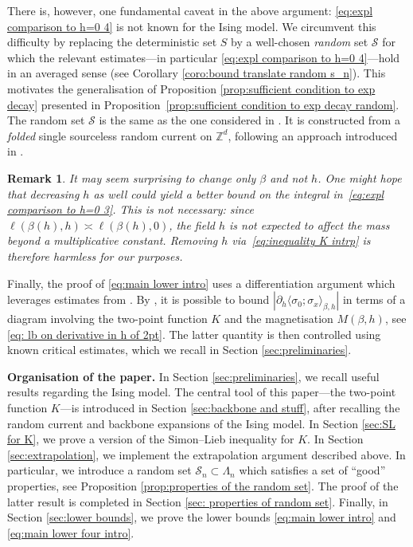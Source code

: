 \documentclass[10pt,a4paper]{amsart}
\numberwithin{equation}{section}
\newtheorem{Rem}[Thm]{Remark}
\begin{document}
There is, however, one fundamental caveat in the above argument: \eqref{eq:expl comparison to h=0 4} is not known for the Ising model.
We circumvent 
this difficulty by replacing the deterministic set $S$ by a well-chosen \emph{random} set 
$\mathcal{S}$ for which the relevant estimates---in particular \eqref{eq:expl comparison to h=0 4}---hold in an 
averaged sense (see Corollary \ref{coro:bound translate random s_n}). This motivates the generalisation of Proposition \ref{prop:sufficient condition to exp decay} presented in 
Proposition~\ref{prop:sufficient condition to exp decay random}. The 
random set $\mathcal{S}$ is the same as the one considered in \cite{DuminilPanis2024newLB}. It is constructed from a \emph{folded} single 
sourceless random current on $\mathbb{Z}^d$, following an approach 
introduced in \cite{AizenmanDuminilTassionWarzelEmergentPlanarity2019}.

\begin{Rem}
It may seem surprising to change only $\beta$ and not $h$. One might hope 
that decreasing $h$ as well could yield a better bound on the integral 
in~\eqref{eq:expl comparison to h=0 3}. This is not necessary: since 
$\ell(\beta(h),h)\asymp\ell(\beta(h),0)$, the field $h$ is not expected 
to affect the mass beyond a multiplicative constant. Removing $h$ 
via~\eqref{eq:inequality K intrp} is therefore harmless for our purposes.
\end{Rem}
 

Finally, the proof of \eqref{eq:main lower intro} uses a differentiation argument which leverages estimates from \cite{AizenmanFernandezCriticalBehaviorMagnetization1986,DuminilPanis2024newLB}. By \cite{AizenmanFernandezCriticalBehaviorMagnetization1986}, it is possible to bound $|\partial_h\langle \sigma_0;\sigma_x\rangle_{\beta,h}|$ in terms of a diagram involving the two-point function $K$ and the magnetisation $M(\beta,h)$, see \eqref{eq: lb on derivative in h of 2pt}. The latter quantity is then controlled using known critical estimates, which we recall in Section \ref{sec:preliminaries}. 

\hfill
 

\noindent\textbf{Organisation of the paper.} In Section \ref{sec:preliminaries}, we recall useful results regarding the Ising model. The central tool of this paper---the two-point function $K$---is introduced in Section \ref{sec:backbone and stuff}, after recalling the random current and backbone expansions of the Ising model. In Section \ref{sec:SL for K}, we prove a version of the Simon--Lieb inequality for $K$. In Section \ref{sec:extrapolation}, we implement the extrapolation argument described above. In particular, we introduce a random set $\mathcal S_n\subset \Lambda_n$ which satisfies a set of ``good'' properties, see Proposition \ref{prop:properties of the random set}. The proof of the latter result is completed in Section \ref{sec: properties of random set}. Finally, in Section \ref{sec:lower bounds}, we prove the lower bounds \eqref{eq:main lower intro} and \eqref{eq:main lower four intro}.
\end{document}
